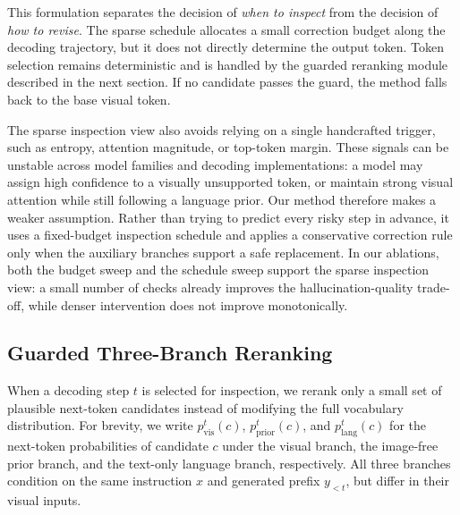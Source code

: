 \documentclass[11pt]{article}
\begin{document}
  This formulation separates the decision of \emph{when to inspect} from the decision of \emph{how to revise}. The sparse schedule allocates a small correction budget along the decoding trajectory, but it does not
  directly determine the output token. Token selection remains deterministic and is handled by the guarded reranking module described in the next section. If no candidate passes the guard, the method falls back to the
  base visual token.

  The sparse inspection view also avoids relying on a single handcrafted trigger, such as entropy, attention magnitude, or top-token margin. These signals can be unstable across model families and decoding
  implementations: a model may assign high confidence to a visually unsupported token, or maintain strong visual attention while still following a language prior. Our method therefore makes a weaker assumption. Rather
  than trying to predict every risky step in advance, it uses a fixed-budget inspection schedule and applies a conservative correction rule only when the auxiliary branches support a safe replacement. In our
  ablations, both the budget sweep and the schedule sweep support the sparse inspection view: a small number of checks already improves the hallucination-quality trade-off, while denser intervention
  does not improve monotonically.

\subsection{Guarded Three-Branch Reranking}

When a decoding step $t$ is selected for inspection, we rerank only a small set of plausible next-token candidates instead of modifying the full vocabulary distribution. For brevity, we write
  $p_{\mathrm{vis}}^t(c)$, $p_{\mathrm{prior}}^t(c)$, and $p_{\mathrm{lang}}^t(c)$
  for the next-token probabilities of candidate $c$ under the visual branch, the image-free prior branch, and the text-only language branch, respectively. All three branches condition on the same instruction $x$ and
  generated prefix $y_{<t}$, but differ in their visual inputs.
\end{document}
